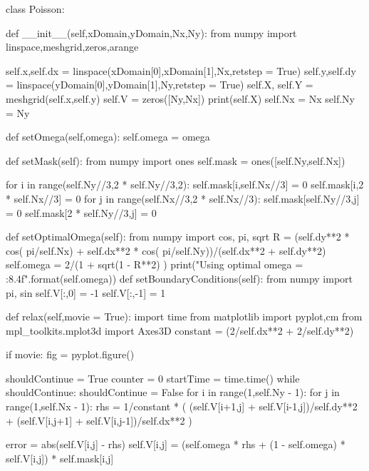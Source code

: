 \begin{codeexample}
\begin{VerbatimOut}{\listingFile}

class Poisson:

    def __init__(self,xDomain,yDomain,Nx,Ny):
        from numpy import linspace,meshgrid,zeros,arange

        
        self.x,self.dx = linspace(xDomain[0],xDomain[1],Nx,retstep = True)
        self.y,self.dy = linspace(yDomain[0],yDomain[1],Ny,retstep = True)
        self.X, self.Y = meshgrid(self.x,self.y)
        self.V = zeros([Ny,Nx])
        print(self.X)
        self.Nx = Nx
        self.Ny = Ny

    def setOmega(self,omega):
        self.omega = omega

    def setMask(self):
        from numpy import ones
        self.mask = ones([self.Ny,self.Nx])

        for i in range(self.Ny//3,2 * self.Ny//3,2):
            self.mask[i,self.Nx//3] = 0
            self.mask[i,2 * self.Nx//3] = 0
        for j in range(self.Nx//3,2 * self.Nx//3):
            self.mask[self.Ny//3,j] = 0
            self.mask[2 * self.Ny//3,j] = 0
      
    def setOptimalOmega(self):
        from numpy import cos, pi, sqrt
        R = (self.dy**2 * cos( pi/self.Nx) + self.dx**2 * cos( pi/self.Ny))/(self.dx**2 + self.dy**2)
        self.omega = 2/(1 + sqrt(1 - R**2) )
        print("Using optimal omega = {:8.4f}".format(self.omega))        
    def setBoundaryConditions(self):
        from numpy import pi, sin
        self.V[:,0] = -1
        self.V[:,-1] = 1

    def relax(self,movie = True):
        import time
        from matplotlib import pyplot,cm
        from mpl_toolkits.mplot3d import Axes3D
        constant = (2/self.dx**2 + 2/self.dy**2)

        
        if movie:
            fig = pyplot.figure()
        
        shouldContinue = True
        counter = 0
        startTime = time.time()
        while shouldContinue:
            shouldContinue = False
            for i in range(1,self.Ny - 1):
                for j in range(1,self.Nx - 1):
                    rhs = 1/constant *  ( (self.V[i+1,j] + self.V[i-1,j])/self.dy**2 + (self.V[i,j+1] + self.V[i,j-1])/self.dx**2 )

                    error = abs(self.V[i,j] - rhs)
                    self.V[i,j] = (self.omega * rhs + (1 - self.omega) * self.V[i,j]) * self.mask[i,j]


\end{VerbatimOut}
\end{codeexample}
